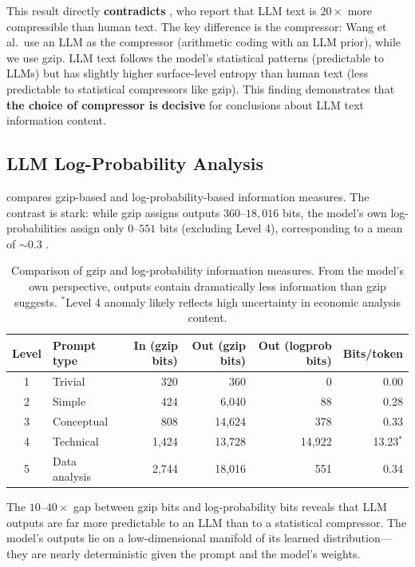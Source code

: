 This result directly \textbf{contradicts} \citet{wang2025lossless}, who report that LLM text is $20\times$ more compressible than human text. The key difference is the compressor: Wang et al.\ use an LLM as the compressor (arithmetic coding with an LLM prior), while we use gzip. LLM text follows the model's statistical patterns (predictable to LLMs) but has slightly higher surface-level entropy than human text (less predictable to statistical compressors like gzip). This finding demonstrates that \textbf{the choice of compressor is decisive} for conclusions about LLM text information content.

\subsection{LLM Log-Probability Analysis}
\label{sec:logprob}

 compares gzip-based and log-probability-based information measures. The contrast is stark: while gzip assigns outputs $360$--$18{,}016$ bits, the model's own log-probabilities assign only $0$--$551$ bits (excluding Level 4), corresponding to a mean of ${\sim}0.3$ \bpt.

\begin{table}[t]
    \centering
    \caption{Comparison of gzip and log-probability information measures. From the model's own perspective, outputs contain dramatically less information than gzip suggests. $^*$Level 4 anomaly likely reflects high uncertainty in economic analysis content.}
    \label{tab:logprob}
    \begin{tabular}{@{}clrrrr@{}}
        \toprule
        \textbf{Level} & \textbf{Prompt type} & \textbf{In (gzip bits)} & \textbf{Out (gzip bits)} & \textbf{Out (logprob bits)} & \textbf{Bits/token} \\
        \midrule
        1 & Trivial & 320 & 360 & 0 & 0.00 \\
        2 & Simple & 424 & 6,040 & 88 & 0.28 \\
        3 & Conceptual & 808 & 14,624 & 378 & 0.33 \\
        4 & Technical & 1,424 & 13,728 & 14,922 & 13.23$^*$ \\
        5 & Data analysis & 2,744 & 18,016 & 551 & 0.34 \\
        \bottomrule
    \end{tabular}
\end{table}

The $10$--$40\times$ gap between gzip bits and log-probability bits reveals that LLM outputs are far more predictable to an LLM than to a statistical compressor. The model's outputs lie on a low-dimensional manifold of its learned distribution---they are nearly deterministic given the prompt and the model's weights.

